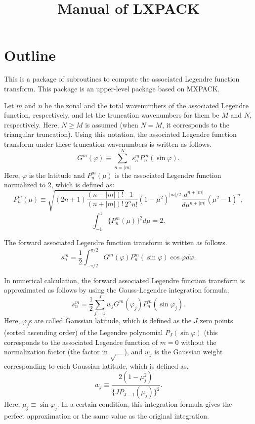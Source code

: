 \documentclass[a4paper]{scrartcl}
\title{Manual of LXPACK}
\author{}
\date{}
\begin{document}
\maketitle

\section{Outline}

This is a package of subroutines to compute the associated
Legendre function transform.
This package is an upper-level package based on MXPACK.

Let $m$ and $n$ be the zonal and the total wavenumbers of
the associated Legendre function, respectively, and 
let the truncation wavenumbers for them be $M$ and $N$,
respectively. Here, $N\ge M$ is assumed (when $N=M$, it corresponds
to the triangular truncation).
Using this notation, the associated Legendre function transform
under these truncation wavenumbers is written as follows.
\begin{equation}
G^m(\varphi)\equiv\sum^N_{n=|m|}s^m_nP^m_n(\sin\varphi).
\end{equation}
Here, $\varphi$ is the latitude and
$P^m_n(\mu)$ is the associated Legendre function normalized to 2,
which is defined as:
\begin{equation}
P^m_n(\mu)\equiv\sqrt{(2n+1)\frac{(n-|m|)!}{(n+|m|)!}}
\frac1{2^nn!}(1-\mu^2)^{|m|/2}
\frac{d^{n+|m|}}{d\mu^{n+|m|}}(\mu^2-1)^n,
\end{equation}
\begin{equation}
\int^1_{-1}\{P^m_n(\mu)\}^2d\mu=2.
\end{equation}

The forward associated Legendre function transform
is written as follows.
\begin{equation}
s^m_n=\frac12\int^{\pi/2}_{-\pi/2}G^m(\varphi)P^m_n(\sin\varphi)\cos\varphi
d\varphi.
\end{equation}

In numerical calculation, the forward associated Legendre function 
transform is approximated as follows by using the Gauss-Legendre
integration formula,
\begin{equation}
s^m_n=\frac12\sum^J_{j=1}w_jG^m(\varphi_j)P^m_n(\sin\varphi_j).
\end{equation}
Here, $\varphi_j$s are called Gaussian latitude, which is defined as
the $J$ zero points (sorted ascending order) of the Legendre
polynomial $P_J(\sin\varphi)$ (this corresponds to 
the associated Legendre function of $m=0$ without the normalization
factor (the factor in $\sqrt{\quad}$), and $w_j$ is 
the Gaussian weight corresponding to each Gaussian latitude, 
which is defined as,
\begin{equation}
w_j\equiv\frac{2(1-\mu_j^2)}{\{JP_{J-1}(\mu_j)\}^2}.
\end{equation}
Here, $\mu_j\equiv\sin\varphi_j$.
In a certain condition, this integration formula gives the 
perfect approximation or the same value as the original integration.
\end{document}
